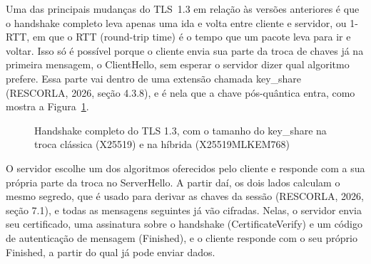 \documentclass[12pt,a4paper]{article}
\newcommand{\fonte}[1]{\par\vspace{4pt}{\small Fonte: #1}}
\begin{document}
Uma das principais mudanças do TLS~1.3 em relação às versões anteriores é
que o handshake completo leva apenas uma ida e volta entre cliente e servidor, ou 1-RTT, em que o
RTT (round-trip time) é o tempo que um pacote leva para ir e voltar. Isso só é possível porque o cliente envia sua parte da troca de
chaves já na primeira mensagem, o ClientHello, sem esperar o
servidor dizer qual algoritmo prefere. Essa parte vai dentro de uma
extensão chamada key\_share (RESCORLA, 2026, seção 4.3.8), e é nela que a chave pós-quântica entra, como mostra a
Figura~\ref{fig:handshake}.

\begin{figure}[H]
\centering
\caption{Handshake completo do TLS 1.3, com o tamanho do key\_share na troca clássica (X25519) e na híbrida (X25519MLKEM768)}
\label{fig:handshake}
\fonte{Adaptado de Rescorla (2026, Figura 1); tamanhos de Kwiatkowski et al. (2026, seções 4.1 e 4.2).}
\end{figure}

O servidor escolhe um dos algoritmos oferecidos pelo cliente e responde com
a sua própria parte da troca no ServerHello. A partir daí, os dois
lados calculam o mesmo segredo, que é usado para derivar as chaves da
sessão (RESCORLA, 2026, seção 7.1), e todas as mensagens seguintes já vão
cifradas. Nelas, o servidor envia seu certificado, uma assinatura sobre o
handshake (CertificateVerify) e um código de autenticação de
mensagem (Finished), e o cliente responde com o seu próprio Finished, a
partir do qual já pode enviar dados.
\end{document}
